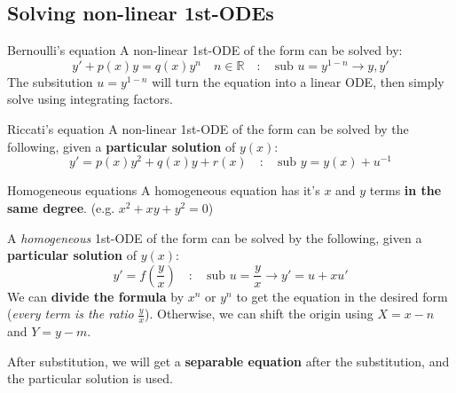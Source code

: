 \documentclass{article}
\begin{document}
\subsection{Solving non-linear 1st-ODEs}
\begin{definition}
    {Bernoulli's equation}
    A non-linear 1st-ODE of the form can be solved by:
    \[y'+p(x)y=q(x)y^n\quad n\in\mathds{R}\quad : \quad \text{sub }u=y^{1-n}\to y,y'\]
    The subsitution $u=y^{1-n}$ will turn the equation into a linear ODE, then simply solve using integrating factors.
\end{definition}
\begin{definition}
    {Riccati's equation}
    A non-linear 1st-ODE of the form can be solved by the following, given a \textbf{particular solution} of $y(x)$:
    \[y'=p(x)y^2+q(x)y+r(x)\quad : \quad \text{sub }y=y(x) + u^{-1}\]
\end{definition}
\begin{definition}
    {Homogeneous equations}
    A homogeneous equation has it's $x$ and $y$ terms \textbf{in the same degree}. (e.g. $x^2+xy+y^2=0$)

    A \emph{homogeneous} 1st-ODE of the form can be solved by the following, given a \textbf{particular solution} of $y(x)$:
    \[y'=f(\frac{y}{x})\quad : \quad \text{sub }u=\frac{y}{x} \to y'=u + xu'\]
    We can \textbf{divide the formula} by $x^n$ or $y^n$ to get the equation in the desired form (\emph{every term is the ratio} $\frac{y}{x}$). Otherwise, we can shift the origin using $X=x-n$ and $Y=y-m$.

    After substitution, we will get a \textbf{separable equation} after the substitution, and the particular solution is used.
\end{definition}
\end{document}
